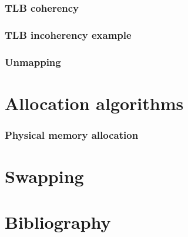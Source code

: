 
\begin{frame}
  \frametitle{TLB coherency}

\end{frame}


\begin{frame}
  \frametitle{TLB incoherency example}

\end{frame}


\begin{frame}
  \frametitle{Unmapping}

\end{frame}

%
%

\section{Allocation algorithms}


\begin{frame}
  \frametitle{Physical memory allocation}

\end{frame}


%
%

\section{Swapping}

%
%

\section{Bibliography}

\begin{thebibliography}{4}


\end{thebibliography}


